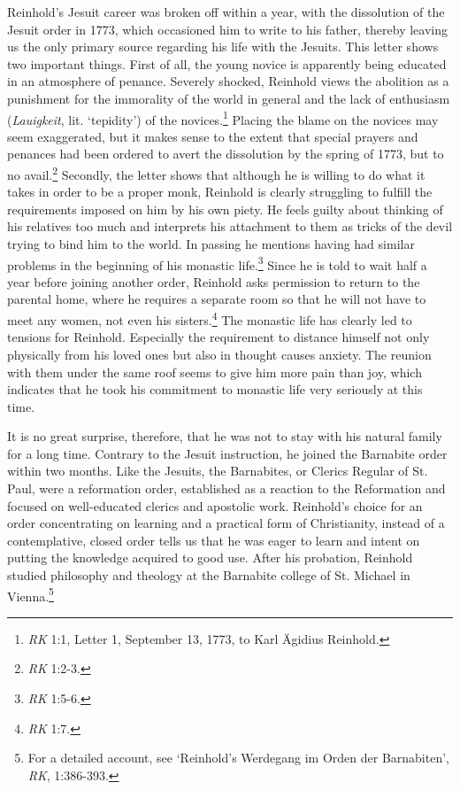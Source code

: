 Reinhold's Jesuit career was broken off within a year, with the dissolution of the Jesuit order in 1773, which occasioned him to write to his father, thereby leaving us the only primary source regarding his life with the Jesuits. This letter shows two important things. First of all, the young novice is apparently being educated in an atmosphere of penance. Severely shocked, Reinhold views the abolition as a punishment for the immorality of the world in general and the lack of enthusiasm (\textit{Lauigkeit}, lit. `tepidity') of the novices.\footnote{ \textit{RK} 1:1, Letter 1, September 13, 1773, to Karl \"{A}gidius Reinhold. } Placing the blame on the novices may seem exaggerated, but it makes sense to the extent that special prayers and penances had been ordered to avert the dissolution by the spring of 1773, but to no avail.\footnote{ \textit{RK} 1:2{-}3.} Secondly, the letter shows that although he is willing to do what it takes in order to be a proper monk, Reinhold is clearly struggling to fulfill the requirements imposed on him by his own piety. He feels guilty about thinking of his relatives too much and interprets his attachment to them as tricks of the devil trying to bind him to the world. In passing he mentions having had similar problems in the beginning of his monastic life.\footnote{ \textit{RK} 1:5{-}6. } Since he is told to wait half a year before joining another order, Reinhold asks permission to return to the parental home, where he requires a separate room so that he will not have to meet any women, not even his sisters.\footnote{ \textit{RK} 1:7.} The monastic life has clearly led to tensions for Reinhold. Especially the requirement to distance himself not only physically from his loved ones but also in thought causes anxiety. The reunion with them under the same roof seems to give him more pain than joy, which indicates that he took his commitment to monastic life very seriously at this time. 

 It is no great surprise, therefore, that he was not to stay with his natural family for a long time. Contrary to the Jesuit instruction, he joined the Barnabite order within two months. Like the Jesuits, the Barnabites, or Clerics Regular of St. Paul, were a reformation order, established as a reaction to the Reformation and focused on well{-}educated clerics and apostolic work. Reinhold's choice for an order concentrating on learning and a practical form of Christianity, instead of a contemplative, closed order tells us that he was eager to learn and intent on putting the knowledge acquired to good use. After his probation, Reinhold studied philosophy and theology at the Barnabite college of St. Michael in Vienna.\footnote{ For a detailed account, see `Reinhold's Werdegang im Orden der Barnabiten', \textit{RK}, 1:386{-}393. } 


